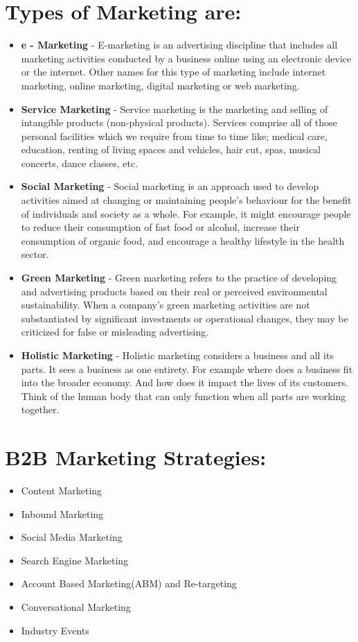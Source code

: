 \documentclass{article}
\begin{document}
\section{Types of Marketing are: }
\begin{itemize}
    \item {\textbf{e - Marketing}} - E-marketing is an advertising discipline that includes all marketing activities conducted by a business online using an electronic device or the internet. Other names for this type of marketing include internet marketing, online marketing, digital marketing or web marketing.
    \item {\textbf{Service Marketing}} - Service marketing is the marketing and selling of intangible products (non-physical products). Services comprise all of those personal facilities which we require from time to time like; medical care, education, renting of living spaces and vehicles, hair cut, spas, musical concerts, dance classes, etc.
    \item {\textbf{Social Marketing}} - Social marketing is an approach used to develop activities aimed at changing or maintaining people's behaviour for the benefit of individuals and society as a whole. For example, it might encourage people to reduce their consumption of fast food or alcohol, increase their consumption of organic food, and encourage a healthy lifestyle in the health sector.
    \item {\textbf{Green Marketing}} - Green marketing refers to the practice of developing and advertising products based on their real or perceived environmental sustainability. When a company's green marketing activities are not substantiated by significant investments or operational changes, they may be criticized for false or misleading advertising.
    \item {\textbf{Holistic Marketing}} - Holistic marketing considers a business and all its parts. It sees a business as one entirety. For example where does a business fit into the broader economy. And how does it impact the lives of its customers. Think of the human body that can only function when all parts are working together.
\end{itemize}

\setlength{\parskip}{1em}

\section{B2B Marketing Strategies:}
\begin{itemize}
    \item Content Marketing
    \item Inbound Marketing
    \item Social Media Marketing
    \item Search Engine Marketing
    \item Account Based Marketing(ABM) and Re-targeting
    \item Conversational Marketing
    \item Industry Events
\end{itemize}
\end{document}
